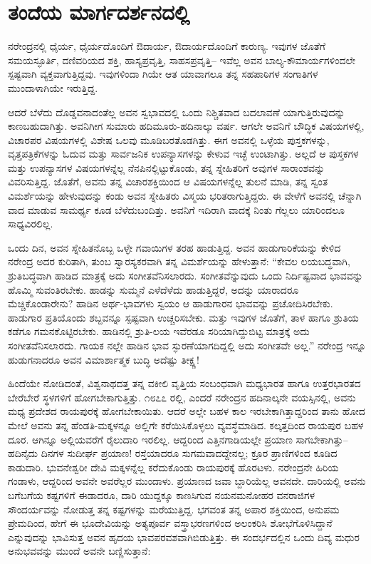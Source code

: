 
\chapter{ತಂದೆಯ ಮಾರ್ಗದರ್ಶನದಲ್ಲಿ}

\noindent

ನರೇಂದ್ರನಲ್ಲಿ ಧೈರ್ಯ, ಧೈರ್ಯದೊಂದಿಗೆ ಔದಾರ್ಯ, ಔದಾರ್ಯದೊಂದಿಗೆ ಕಾರುಣ್ಯ. ಇವುಗಳ ಜೊತೆಗೆ ಸಮಯಸ್ಫೂರ್ತಿ, ದಣಿವರಿಯದ ಶಕ್ತಿ, ಹಾಸ್ಯಪ್ರವೃತ್ತಿ, ಸಾಹಸಪ್ರವೃತ್ತಿ– ಇವೆಲ್ಲ ಅವನ ಬಾಲ್ಯ-ಕೌಮಾರ್ಯಗಳಿಂದಲೇ ಸ್ಪಷ್ಟವಾಗಿ ವ್ಯಕ್ತವಾಗುತ್ತಿದ್ದವು. ಇವುಗಳಿಂದಾ ಗಿಯೇ ಆತ ಯಾವಾಗಲೂ ತನ್ನ ಸಹಪಾಠಿಗಳ ಸಂಗಾತಿಗಳ ಮುಂದಾಳಾಗಿಯೇ ಇರುತ್ತಿದ್ದ.

ಆದರೆ ಬೆಳೆದು ದೊಡ್ಡವನಾದಂತೆಲ್ಲ ಅವನ ಸ್ವಭಾವದಲ್ಲಿ ಒಂದು ನಿಶ್ಚಿತವಾದ ಬದಲಾವಣೆ ಯಾಗುತ್ತಿರುವುದನ್ನು ಕಾಣಬಹುದಾಗಿತ್ತು. ಅವನಿಗೀಗ ಸುಮಾರು ಹದಿಮೂರು-ಹದಿನಾಲ್ಕು ವರ್ಷ. ಆಗಲೇ ಅವನಿಗೆ ಬೌದ್ಧಿಕ ವಿಷಯಗಳಲ್ಲಿ, ವಿಚಾರಪರ ವಿಷಯಗಳಲ್ಲಿ ವಿಶೇಷ ಒಲವು ಮೂಡಿಬರತೊಡಗಿತ್ತು. ಈಗ ಅವನಲ್ಲಿ ಒಳ್ಳೆಯ ಪುಸ್ತಕಗಳನ್ನು, ವೃತ್ತಪತ್ರಿಕೆಗಳನ್ನು ಓದುವ ಮತ್ತು ಸಾರ್ವಜನಿಕ ಉಪನ್ಯಾಸಗಳನ್ನು ಕೇಳುವ ಇಚ್ಛೆ ಉಂಟಾಗಿತ್ತು. ಅಲ್ಲದೆ ಆ ಪುಸ್ತಕಗಳ ಮತ್ತು ಉಪನ್ಯಾಸಗಳ ವಿಷಯಗಳನ್ನೆಲ್ಲ ನೆನಪಿನಲ್ಲಿಟ್ಟುಕೊಂಡು, ತನ್ನ ಸ್ನೇಹಿತರಿಗೆ ಅವುಗಳ ಸಾರಾಂಶವನ್ನು ವಿವರಿಸುತ್ತಿದ್ದ. ಜೊತೆಗೆ, ಅವನು ತನ್ನ ವಿಚಾರಶಕ್ತಿಯಿಂದ ಆ ವಿಷಯಗಳನ್ನೆಲ್ಲ ತುಲನೆ ಮಾಡಿ, ತನ್ನ ಸ್ವಂತ ವಿಮರ್ಶೆಯನ್ನು ಹೇಳುವುದನ್ನು ಕಂಡು ಅವನ ಸ್ನೇಹಿತರು ವಿಸ್ಮಯ ಭರಿತರಾಗುತ್ತಿದ್ದರು. ಈ ವೇಳೆಗೆ ಅವನಲ್ಲಿ ಚೆನ್ನಾಗಿ ವಾದ ಮಾಡುವ ಸಾಮರ್ಥ್ಯ ಕೂಡ ಬೆಳೆದುಬಂದಿತ್ತು. ಅವನಿಗೆ ಇದಿರಾಗಿ ವಾದಕ್ಕೆ ನಿಂತು ಗೆಲ್ಲಲು ಯಾರಿಂದಲೂ ಸಾಧ್ಯವಿರಲಿಲ್ಲ.

ಒಂದು ದಿನ, ಅವನ ಸ್ನೇಹಿತನೊಬ್ಬ ಒಳ್ಳೇ ಗವಾಯಿಗಳ ತರಹ ಹಾಡುತ್ತಿದ್ದ. ಅವನ ಹಾಡುಗಾರಿಕೆಯನ್ನು ಕೇಳಿದ ನರೇಂದ್ರ ಅದರ ಕುರಿತಾಗಿ, ತುಂಬ ಸ್ವಾರಸ್ಯಕರವಾಗಿ ತನ್ನ ವಿಮರ್ಶೆಯನ್ನು ಹೇಳುತ್ತಾನೆ: “ಕೇವಲ ಲಯಬದ್ಧವಾಗಿ, ಶ್ರುತಿಬದ್ಧವಾಗಿ ಹಾಡಿದ ಮಾತ್ರಕ್ಕೆ ಅದು ಸಂಗೀತವೆನಿಸಲಾರದು. ಸಂಗೀತವೆನ್ನುವುದು ಒಂದು ನಿರ್ದಿಷ್ಟವಾದ ಭಾವವನ್ನು ಹೊಮ್ಮಿ ಸುವಂತಿರಬೇಕು. ಹಾಡನ್ನು ಸುಮ್ಮನೆ ಎಳೆದೆಳೆದು ಹಾಡುತ್ತಿದ್ದರೆ, ಅದನ್ನು ಯಾರಾದರೂ ಮೆಚ್ಚಿಕೊಂಡಾರೇನು? ಹಾಡಿನ ಅರ್ಥ-ಭಾವಗಳು ಸ್ವಯಂ ಆ ಹಾಡುಗಾರನ ಭಾವವನ್ನು ಪ್ರಚೋದಿಸಿರಬೇಕು. ಹಾಡುಗಾರ ಪ್ರತಿಯೊಂದು ಶಬ್ದವನ್ನೂ ಸ್ಪಷ್ಟವಾಗಿ ಉಚ್ಚರಿಸಬೇಕು. ಮತ್ತು ಇವುಗಳ ಜೊತೆಗೆ, ತಾಳ ಹಾಗೂ ಶ್ರುತಿಯ ಕಡೆಗೂ ಗಮನಕೊಟ್ಟಿರಬೇಕು. ಹಾಡಿನಲ್ಲಿ ಶ್ರುತಿ-ಲಯ ಇವೆರಡೂ ಸರಿಯಾಗಿದ್ದುಬಿಟ್ಟ ಮಾತ್ರಕ್ಕೆ ಅದು ಸಂಗೀತವೆನಿಸಲಾರದು. ಗಾಯಕ ನಲ್ಲೇ ಹಾಡಿನ ಭಾವ ಸ್ಫುರಣೆಯಾಗದಿದ್ದಲ್ಲಿ ಅದು ಸಂಗೀತವೇ ಅಲ್ಲ.” ನರೇಂದ್ರ ಇನ್ನೂ ಹುಡುಗನಾದರೂ ಅವನ ವಿಮಾರ್ಶಾತ್ಮಕ ಬುದ್ಧಿ ಅದೆಷ್ಟು ತೀಕ್ಷ್ಣ!

ಹಿಂದೆಯೇ ನೋಡಿದಂತೆ, ವಿಶ್ವನಾಥದತ್ತ ತನ್ನ ವಕೀಲಿ ವೃತ್ತಿಯ ಸಂಬಂಧವಾಗಿ ಮಧ್ಯಭಾರತ ಹಾಗೂ ಉತ್ತರಭಾರತದ ಬೇರೆಬೇರೆ ಸ್ಥಳಗಳಿಗೆ ಹೋಗಬೇಕಾಗುತ್ತಿತ್ತು. ೧೮೭೭ ರಲ್ಲಿ, ಎಂದರೆ ನರೇಂದ್ರನ ಹದಿನಾಲ್ಕನೇ ವಯಸ್ಸಿನಲ್ಲಿ, ಅವನು ಮಧ್ಯ ಪ್ರದೇಶದ ರಾಯಪುರಕ್ಕೆ ಹೋಗಬೇಕಾಯಿತು. ಆದರೆ ಅಲ್ಲೇ ಬಹಳ ಕಾಲ ಇರಬೇಕಾಗಿತ್ತಾದ್ದರಿಂದ ತಾನು ಹೋದ ಮೇಲೆ ಅವನು ತನ್ನ ಹೆಂಡತಿ-ಮಕ್ಕಳನ್ನೂ ಅಲ್ಲಿಗೇ ಕರೆಯಿಸಿಕೊಳ್ಳಲು ವ್ಯವಸ್ಥೆಮಾಡಿದ. ಕಲ್ಕತ್ತದಿಂದ ರಾಯಪುರ ಬಹಳ ದೂರ. ಆಗಿನ್ನೂ ಅಲ್ಲಿಯವರೆಗೆ ರೈಲುದಾರಿ ಇರಲಿಲ್ಲ. ಆದ್ದರಿಂದ ಎತ್ತಿನಗಾಡಿಯಲ್ಲೇ ಪ್ರಯಾಣ ಸಾಗಬೇಕಾಗಿತ್ತು–ಹದಿನೈದು ದಿನಗಳ ಸುದೀರ್ಘ ಪ್ರಯಾಣ! ರಸ್ತೆಯಾದರೂ ಸುಗಮವಾದದ್ದೇನಲ್ಲ; ಕ್ರೂರ ಪ್ರಾಣಿಗಳಿಂದ ಕೂಡಿದ ಕಾಡುದಾರಿ. ಭುವನೇಶ್ವರೀ ದೇವಿ ಮಕ್ಕಳನ್ನೆಲ್ಲ ಕರೆದುಕೊಂಡು ರಾಯಪುರಕ್ಕೆ ಹೊರಟಳು. ನರೇಂದ್ರನೇ ಹಿರಿಯ ಗಂಡಾಳು, ಆದ್ದರಿಂದ ಅವನೇ ಅವರೆಲ್ಲರ ಮುಂದಾಳು. ಪ್ರಯಾಣದ ಜವಾ ಬ್ದಾರಿಯೆಲ್ಲ ಅವನದೇ. ದಾರಿಯಲ್ಲಿ ಅವನು ಬಗೆಬಗೆಯ ಕಷ್ಟಗಳಿಗೆ ಈಡಾದರೂ, ದಾರಿ ಯುದ್ದಕ್ಕೂ ಕಾಣಸಿಗುವ ನಯನಮನೋಹರ ವನರಾಜಿಗಳ ಸೌಂದರ್ಯವನ್ನು ನೋಡುತ್ತ ತನ್ನ ಕಷ್ಟಗಳನ್ನು ಮರೆಯುತ್ತಿದ್ದ. ಭಗವಂತ ತನ್ನ ಅಪಾರ ಶಕ್ತಿಯಿಂದ, ಅನುಪಮ ಪ್ರೇಮದಿಂದ, ಹೇಗೆ ಈ ಭೂದೇವಿಯನ್ನು ಅತ್ಯಪೂರ್ವ ವಸ್ತ್ರಾಭರಣಗಳಿಂದ ಅಲಂಕರಿಸಿ ಶೋಭೆಗೊಳಿಸಿದ್ದಾನೆ ಎನ್ನುವುದನ್ನು ಭಾವಿಸುತ್ತ ಅವನ ಹೃದಯ ಭಾವಪರವಶವಾಗಿಬಿಡುತ್ತಿತ್ತು. ಈ ಸಂದರ್ಭದಲ್ಲಿನ ಒಂದು ದಿವ್ಯ ಮಧುರ ಅನುಭವವನ್ನು ಮುಂದೆ ಅವನೇ ಬಣ್ಣಿಸುತ್ತಾನೆ:

